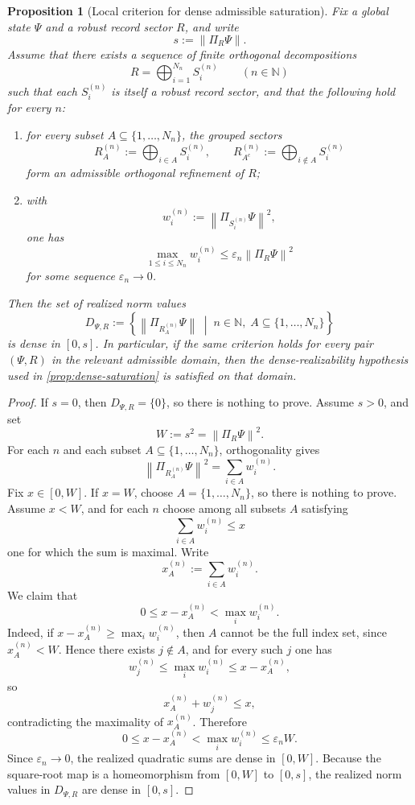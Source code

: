 \documentclass[10pt,a4paper]{amsart}
\newtheorem{proposition}{Proposition}
\newcommand{\Proj}[1]{\Pi_{#1}}
\newcommand{\norm}[1]{\left\lVert #1 \right\rVert}
\begin{document}
\begin{proposition}[Local criterion for dense admissible saturation]
\label{prop:local-dense-saturation-criterion}
Fix a global state \(\Psi\) and a robust record sector \(R\), and write
\[
s := \norm{\Proj{R}\Psi}.
\]
Assume that there exists a sequence of finite orthogonal decompositions
\[
R = \bigoplus_{i=1}^{N_n} S_i^{(n)}
\qquad (n\in\mathbb{N})
\]
such that each \(S_i^{(n)}\) is itself a robust record sector, and that
the following hold for every \(n\):
\begin{enumerate}[label=(\roman*)]
\item for every subset \(A \subseteq \{1,\dots,N_n\}\), the grouped sectors
\[
R_A^{(n)} := \bigoplus_{i\in A} S_i^{(n)},
\qquad
R_{A^c}^{(n)} := \bigoplus_{i\notin A} S_i^{(n)}
\]
form an admissible orthogonal refinement of \(R\);
\item with
\[
w_i^{(n)} := \norm{\Proj{S_i^{(n)}}\Psi}^2,
\]
one has
\[
\max_{1\le i\le N_n} w_i^{(n)}
\le
\varepsilon_n \norm{\Proj{R}\Psi}^2
\]
for some sequence \(\varepsilon_n \to 0\).
\end{enumerate}
Then the set of realized norm values
\[
D_{\Psi,R}
:=
\left\{
\norm{\Proj{R_A^{(n)}}\Psi}
\;\middle|\;
n\in\mathbb{N},\;
A\subseteq\{1,\dots,N_n\}
\right\}
\]
is dense in \([0,s]\). In particular, if the same criterion holds for
every pair \((\Psi,R)\) in the relevant admissible domain, then the
dense-realizability hypothesis used in \cref{prop:dense-saturation} is
satisfied on that domain.
\end{proposition}

\begin{proof}
If \(s=0\), then \(D_{\Psi,R}=\{0\}\), so there is nothing to prove.
Assume \(s>0\), and set
\[
W := s^2 = \norm{\Proj{R}\Psi}^2.
\]
For each \(n\) and each subset \(A \subseteq \{1,\dots,N_n\}\),
orthogonality gives
\[
\norm{\Proj{R_A^{(n)}}\Psi}^2
=
\sum_{i\in A} w_i^{(n)}.
\]
Fix \(x\in[0,W]\). If \(x=W\), choose \(A=\{1,\dots,N_n\}\), so there
is nothing to prove. Assume \(x<W\), and for each \(n\) choose among
all subsets \(A\) satisfying
\[
\sum_{i\in A} w_i^{(n)} \le x
\]
one for which the sum is maximal. Write
\[
x_A^{(n)} := \sum_{i\in A} w_i^{(n)}.
\]
We claim that
\[
0 \le x - x_A^{(n)} < \max_i w_i^{(n)}.
\]
Indeed, if \(x - x_A^{(n)} \ge \max_i w_i^{(n)}\), then \(A\) cannot be
the full index set, since \(x_A^{(n)}<W\). Hence there exists
\(j\notin A\), and for every such \(j\) one has
\[
w_j^{(n)} \le \max_i w_i^{(n)} \le x - x_A^{(n)},
\]
so
\[
x_A^{(n)} + w_j^{(n)} \le x,
\]
contradicting the maximality of \(x_A^{(n)}\). Therefore
\[
0 \le x - x_A^{(n)} < \max_i w_i^{(n)}
\le
\varepsilon_n W.
\]
Since \(\varepsilon_n \to 0\), the realized quadratic sums are dense in
\([0,W]\). Because the square-root map is a homeomorphism from
\([0,W]\) to \([0,s]\), the realized norm values in \(D_{\Psi,R}\) are
dense in \([0,s]\).
\end{proof}
\end{document}
